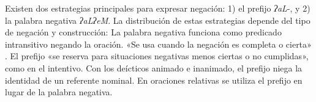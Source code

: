 Existen dos estrategias principales para expresar negación: 1) el prefijo {\setmainfont{Charis SIL}\textit{ʔaL}-}, y 2) la palabra negativa {\setmainfont{Charis SIL}\textit{ʔaLʔeM}}. La distribución de estas estrategias depende del tipo de negación y construcción: La palabra negativa funciona como predicado intransitivo negando la oración. «Se usa cuando la negación es completa o cierta» \textcolor{MidnightBlue}{\citep[pág. 32]{chinanteco}}. El prefijo «se reserva para situaciones negativas menos ciertas o no cumplidas», como en el intentivo. Con los deícticos animado e inanimado, el prefijo niega la identidad de un referente nominal. En oraciones relativas se utiliza el prefijo en lugar de la palabra negativa.